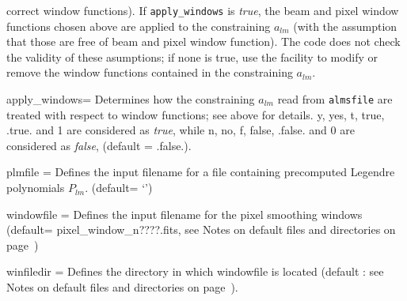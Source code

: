 \begin{qualifiers}
\begin{qulistwide}{}
    correct window functions). If {\tt apply\_windows} is {\em true}, the beam and
    pixel window functions chosen above are applied to the constraining $a_{lm}$ (with the
    assumption that those are free of beam and pixel window function). The code
    does not check the validity of these asumptions; if none is true, use the
     facility to modify or remove
    the window functions contained in the constraining $a_{lm}$.
%
     \item[{apply\_windows=}] Determines how the constraining $a_{lm}$  read from
     {\tt almsfile} are
     treated with respect to window functions; see above for details. 
     y, yes, t, true, .true. and 1 are considered as {\em true}, while n, no, f,
     false, .false. and 0 are considered as {\em false}, (default = .false.).
%
     \item[{plmfile = }] Defines the input  filename for a file
    containing  precomputed Legendre polynomials $P_{lm}$.
(default= `')
     \item[{windowfile = }] Defines the input filename  for the pixel
    smoothing windows 
(default= pixel\_window\_n????.fits, see Notes on default files and directories on page~\pageref{page:defdir})
     \item[{winfiledir = }] Defines the directory in which windowfile
    is located (default : see Notes on default files and directories on page~\pageref{page:defdir}).
  \end{qulistwide}
\end{qualifiers}

